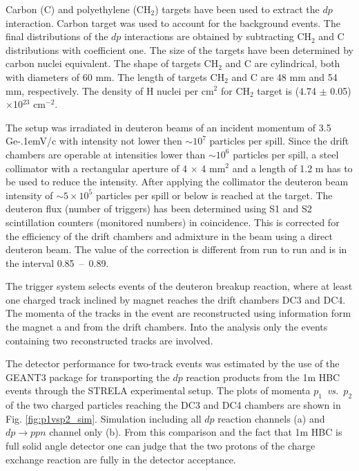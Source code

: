 \documentclass[twocolumn,epjc3]{svjour3}
\newcommand{\dpfrag} {\ensuremath{dp \rightarrow ppn}\xspace}
\newcommand{\dpchex} {\ensuremath{dp \rightarrow (pp)n}\xspace}
\newcommand{\GeVc}   {Ge\kern-.1emV/c\xspace}
\begin{document}
Carbon (C) and polyethylene (CH$_2$) targets have been used to extract the $dp$
interaction. Carbon target was used to account for the background events. The
final distributions of the $dp$ interactions are obtained by subtracting CH$_2$
and C distributions with coefficient one. The size of the targets have been
determined by carbon nuclei equivalent. The shape of targets CH$_2$ and C are
cylindrical, both with diameters of 60 mm. The length of targets CH$_2$ and C
are 48 mm and 54 mm, respectively. The density of H nuclei per cm$^2$ for CH$_2$
target is (4.74 $\pm$ 0.05)$\times$10$^{23}$ cm$^{-2}$.

The setup was irradiated in deuteron beams of an incident momentum of 3.5 \GeVc
with intensity not lower then $\sim 10^{7}$ particles per spill. Since the drift
chambers are operable at intensities lower than $\sim 10^{6}$ particles per
spill, a steel collimator with a rectangular aperture of 4 $\times$ 4 mm$^2$ and
a length of 1.2 m has to be used to reduce the intensity. After applying the
collimator the deuteron beam intensity of $\sim 5\times10^5$ particles per spill
or below is reached at the target. The deuteron flux (number of triggers) has
been determined using S1 and S2 scintillation counters (monitored numbers) in
coincidence. This is corrected for the efficiency of the drift chambers and
admixture in the beam using a direct deuteron beam. The value of the correction
is different from run to run and is in the interval 0.85~--~0.89.

The trigger system selects events of the deuteron breakup reaction, where at
least one charged track inclined by magnet reaches the drift chambers DC3 and
DC4. The momenta of the tracks in the event are reconstructed using information
form the magnet a and from the drift chambers. Into the analysis only the events
containing two reconstructed tracks are involved.

The detector performance for two-track events was estimated by the use of the
GEANT3 package for transporting the $dp$ reaction products from the 1m HBC
events through the STRELA experimental setup. The plots of momenta
$p_1$~\textit{vs.}~$p_2$ of the two charged particles reaching the DC3 and DC4
chambers are shown in Fig. \ref{fig:p1vsp2_sim}. Simulation including all $dp$
reaction channels (a) and \dpfrag channel only (b). From this comparison and the
fact that 1m HBC is full solid angle detector one can judge that the two protons
of the charge exchange reaction are fully in the detector acceptance.
\end{document}
